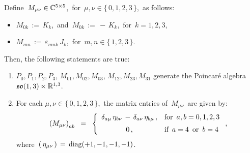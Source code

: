 \vskip 0.5cm
\begin{proposition}
\mbox{}
\vskip 0.1cm
\noindent
Define \,$M_{\mu\nu} \in \mathbb{C}^{5 \times 5}$,\,
for \,$\mu, \nu \in \{\,0,1,2,3\,\}$,\, as follows:
\begin{itemize}
\item
	$M_{0k} \, := \, K_{k}$,\, and \,$M_{0k} \, := \, -\,K_{k}$,\, for \,$k = 1,2,3$,
\item
	$M_{mn} \, := \, \varepsilon_{mnk} \, J_{k}$,\, for \,$m, n \in \{\,1,2,3\,\}$.
\end{itemize}
Then, the following statements are true:
\begin{enumerate}
\item
	$P_{0}, P_{1}, P_{2}, P_{3}$,\;\;
	$M_{01}, M_{02}, M_{03}$,\;\;
	$M_{12}, M_{23}, M_{31}$\;\;
	generate the Poincaré algebra
	\,$\mathfrak{so}(1,3) \ltimes \mathbb{R}^{1,3}$.\,
\item
	For each $\mu, \nu \in \{\,0,1,2,3\,\}$,\,
	the matrix entries of \,$M_{\mu\nu}$\, are given by:
	\begin{equation*}
	\left(M_{\mu\nu}\right)_{ab}
	\;\; = \;\;
		\left\{\begin{array}{cl}
			\delta_{a\mu}\,\eta_{b\nu}
			\,-\,
			\delta_{a\nu}\,\eta_{b\mu}\,,
			& \textnormal{for \,$a, b = 0,1,2,3$}
			\\
			\overset{{\color{white}1}}{0}\,,
			& \textnormal{if \,$a = 4$\, or \,$b = 4$}
			\end{array}\right.,
	\end{equation*}
	where
	\,$\left(\,\eta_{\mu\nu}\,\right) \,=\, \textnormal{diag}(+1,-1,-1,-1)$.\,
\end{enumerate}
\end{proposition}
\proof

